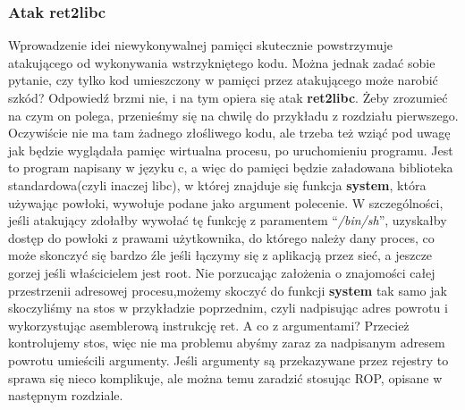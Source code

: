 \documentclass[polish]{kbk}
\begin{document}
\subsubsection{Atak ret2libc}
Wprowadzenie idei niewykonywalnej pamięci skutecznie powstrzymuje atakującego od 
wykonywania wstrzykniętego kodu. Można jednak zadać sobie pytanie, czy tylko kod 
umieszczony w pamięci przez atakującego może narobić szkód? Odpowiedź brzmi nie, i 
na tym opiera się atak \textbf{ret2libc}. Żeby zrozumieć na czym on polega, 
przenieśmy się na chwilę do przykładu z rozdziału pierwszego. Oczywiście nie ma 
tam żadnego złośliwego kodu, ale trzeba też wziąć pod uwagę jak będzie wyglądała 
pamięc wirtualna procesu, po uruchomieniu programu. Jest to program napisany w 
języku c, a więc do pamięci będzie załadowana biblioteka standardowa(czyli 
inaczej libc), w której znajduje się funkcja \textbf{system}, która używając 
powłoki, wywołuje podane jako argument polecenie. W szczególności, jeśli atakujący 
zdołałby wywołać tę funkcję z paramentem ``\textit{/bin/sh}'', uzyskałby dostęp 
do powłoki z prawami użytkownika, do którego należy dany proces, co może skonczyć 
się bardzo źle jeśli łączymy się z aplikacją przez sieć, a jeszcze gorzej jeśli 
właścicielem jest root. Nie porzucając założenia o znajomości całej przestrzenii 
adresowej procesu,możemy skoczyć do funkcji \textbf{system} tak samo jak skoczyliśmy 
na stos w przykładzie poprzednim, czyli nadpisując adres powrotu i wykorzystując 
asemblerową instrukcję ret. A co z argumentami? Przecież kontrolujemy stos, więc 
nie ma problemu abyśmy zaraz za nadpisanym adresem powrotu umieścili argumenty. 
Jeśli argumenty są przekazywane przez rejestry to sprawa się nieco komplikuje, 
ale można temu zaradzić stosując ROP, opisane w następnym rozdziale.
 
\end{document}
